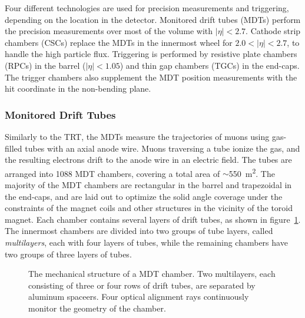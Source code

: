 Four different technologies are used for precision measurements and triggering, depending on the location in the detector. Monitored drift tubes (MDTs) perform the precision measurements over most of the volume with $|\eta|<2.7$. Cathode strip chambers (CSCs) replace the MDTs in the innermost wheel for $2.0<|\eta|<2.7$, to handle the high particle flux. Triggering is performed by resistive plate chambers (RPCs) in the barrel ($|\eta|<1.05$) and thin gap chambers (TGCs) in the end-caps. The trigger chambers also supplement the MDT position measurements with the hit coordinate in the non-bending plane. 

\subsubsection{Monitored Drift Tubes}
Similarly to the TRT, the MDTs measure the trajectories of muons using gas-filled tubes with an axial anode wire. Muons traversing a tube ionize the gas, and the resulting electrons drift to the anode wire in an electric field. The tubes are arranged into 1088 MDT chambers, covering a total area of $\sim$\SI{550}{\meter\tothe{2}}. The majority of the MDT chambers are rectangular in the barrel and trapezoidal in the end-caps, and are laid out to optimize the solid angle coverage under the constraints of the magnet coils and other structures in the vicinity of the toroid magnet. Each chamber contains several layers of drift tubes, as shown in figure~\ref{fig:ATLAS-MS-MDT-chamber}. The innermost chambers are divided into two groups of tube layers, called \emph{multilayers}, each with four layers of tubes, while the remaining chambers have two groups of three layers of tubes. 

\begin{figure}[htbp]
	\centering
	\caption{The mechanical structure of a MDT chamber. Two multilayers, each consisting of three or four rows of drift tubes, are separated by aluminum spaceers. Four optical alignment rays continuously monitor the geometry of the chamber.}
	\label{fig:ATLAS-MS-MDT-chamber}
\end{figure}

